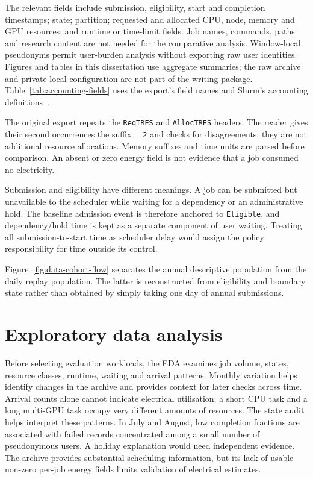 The relevant fields include submission, eligibility, start and completion timestamps; state; partition; requested and allocated CPU, node, memory and GPU resources; and runtime or time-limit fields. Job names, commands, paths and research content are not needed for the comparative analysis. Window-local pseudonyms permit user-burden analysis without exporting raw user identities. Figures and tables in this dissertation use aggregate summaries; the raw archive and private local configuration are not part of the writing package.
Table~\ref{tab:accounting-fields} uses the export's field names and Slurm's accounting definitions~\cite{schedmdSacct}.

The original export repeats the \texttt{ReqTRES} and \texttt{AllocTRES} headers. The reader gives their second occurrences the suffix \texttt{\_\_2} and checks for disagreements; they are not additional resource allocations. Memory suffixes and time units are parsed before comparison. An absent or zero energy field is not evidence that a job consumed no electricity.


Submission and eligibility have different meanings. A job can be submitted but unavailable to the scheduler while waiting for a dependency or an administrative hold. The baseline admission event is therefore anchored to \texttt{Eligible}, and dependency/hold time is kept as a separate component of user waiting. Treating all submission-to-start time as scheduler delay would assign the policy responsibility for time outside its control.

Figure~\ref{fig:data-cohort-flow} separates the annual descriptive population from the daily replay population. The latter is reconstructed from eligibility and boundary state rather than obtained by simply taking one day of annual submissions.

\FloatBarrier

\section{Exploratory data analysis}
Before selecting evaluation workloads, the EDA examines job volume, states, resource classes, runtime, waiting and arrival patterns. Monthly variation helps identify changes in the archive and provides context for later checks across time. Arrival counts alone cannot indicate electrical utilisation: a short CPU task and a long multi-GPU task occupy very different amounts of resources.
\FloatBarrier
The state audit helps interpret these patterns. In July and August, low completion fractions are associated with failed records concentrated among a small number of pseudonymous users. A holiday explanation would need independent evidence. The archive provides substantial scheduling information, but its lack of usable non-zero per-job energy fields limits validation of electrical estimates.

